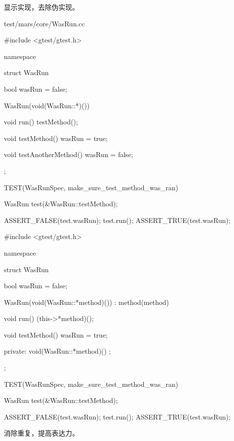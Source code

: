 显示实现，去除伪实现。

\begin{diff}{test/mars/core/WasRun.cc}
\begin{minicpp}
#include <gtest/gtest.h>

namespace {
  struct WasRun {
    bool wasRun = false;

    WasRun(void(WasRun::*)()) {
    }

    void run() {
      testMethod();
    }

    void testMethod() {
      wasRun = true;
    }

    void testAnotherMethod() {
      wasRun = false;
    }
  };
}

TEST(WasRunSpec, make_sure_test_method_was_ran) {
  WasRun test(&WasRun::testMethod);

  ASSERT_FALSE(test.wasRun);
  test.run();
  ASSERT_TRUE(test.wasRun);
}
\end{minicpp}
\tcblower
\begin{minicpp}
#include <gtest/gtest.h>

namespace {
  struct WasRun {
    bool wasRun = false;

    WasRun(void(WasRun::*method)()) : method(method) {
    }

    void run() {
      (this->*method)();
    }

    void testMethod() {
      wasRun = true;
    }

  private:
    void(WasRun::*method)() ;
  };
}

TEST(WasRunSpec, make_sure_test_method_was_ran) {
  WasRun test(&WasRun::testMethod);

  ASSERT_FALSE(test.wasRun);
  test.run();
  ASSERT_TRUE(test.wasRun);
}
\end{minicpp}
\end{diff}

消除重复，提高表达力。

